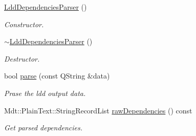 \begin{DoxyCompactItemize}
\item 
\hyperlink{class_mdt_1_1_deploy_utils_1_1_ldd_dependencies_parser_aa06c5965c3adaa271321ccecef14b65c}{Ldd\+Dependencies\+Parser} ()\hypertarget{class_mdt_1_1_deploy_utils_1_1_ldd_dependencies_parser_aa06c5965c3adaa271321ccecef14b65c}{}\label{class_mdt_1_1_deploy_utils_1_1_ldd_dependencies_parser_aa06c5965c3adaa271321ccecef14b65c}

\begin{DoxyCompactList}\small\item\em Constructor. \end{DoxyCompactList}\item 
\hyperlink{class_mdt_1_1_deploy_utils_1_1_ldd_dependencies_parser_aa5ab2d4b01b68b132a973b3b58db4b8a}{$\sim$\+Ldd\+Dependencies\+Parser} ()\hypertarget{class_mdt_1_1_deploy_utils_1_1_ldd_dependencies_parser_aa5ab2d4b01b68b132a973b3b58db4b8a}{}\label{class_mdt_1_1_deploy_utils_1_1_ldd_dependencies_parser_aa5ab2d4b01b68b132a973b3b58db4b8a}

\begin{DoxyCompactList}\small\item\em Destructor. \end{DoxyCompactList}\item 
bool \hyperlink{class_mdt_1_1_deploy_utils_1_1_ldd_dependencies_parser_aa2c2457f54068d376232fbc07446b8fd}{parse} (const Q\+String \&data)\hypertarget{class_mdt_1_1_deploy_utils_1_1_ldd_dependencies_parser_aa2c2457f54068d376232fbc07446b8fd}{}\label{class_mdt_1_1_deploy_utils_1_1_ldd_dependencies_parser_aa2c2457f54068d376232fbc07446b8fd}

\begin{DoxyCompactList}\small\item\em Prase the ldd output data. \end{DoxyCompactList}\item 
Mdt\+::\+Plain\+Text\+::\+String\+Record\+List \hyperlink{class_mdt_1_1_deploy_utils_1_1_ldd_dependencies_parser_a2ccf5f86c355f916a0e9a304537e4087}{raw\+Dependencies} () const \hypertarget{class_mdt_1_1_deploy_utils_1_1_ldd_dependencies_parser_a2ccf5f86c355f916a0e9a304537e4087}{}\label{class_mdt_1_1_deploy_utils_1_1_ldd_dependencies_parser_a2ccf5f86c355f916a0e9a304537e4087}

\begin{DoxyCompactList}\small\item\em Get parsed dependencies. \end{DoxyCompactList}\end{DoxyCompactItemize}


